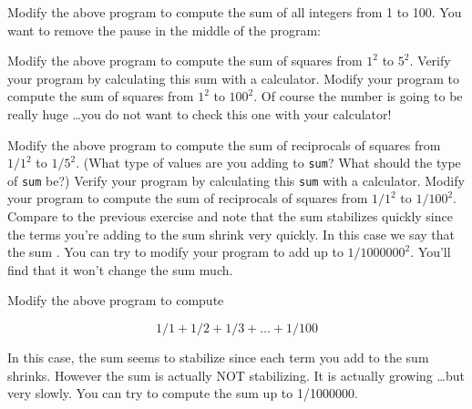 \begin{ex}
 Modify the above program to compute the sum of all
integers from 1 to 100. You want to remove the pause in the middle of
the program:
    
\end{ex}

\begin{ex}
Modify the above program to compute the sum of squares from $1^{2}$ to $5^{2}$. Verify your program by calculating this sum with a calculator. Modify your program to compute the sum of squares from $1^{2}$ to $100^{2}$. Of course the number is going to be really huge \ldots you do not want to check this one with your calculator!
\end{ex}

\begin{ex}
Modify the above program to compute the sum of reciprocals of squares from $1/1^{2}$ to $1/5^{2}$. (What type of values are you adding to \texttt{sum}? What should the type of \texttt{sum} be?) Verify your program by calculating this \texttt{sum} with a calculator. Modify your program to compute the sum of reciprocals of squares from $1/1^{2}$ to $1/100^{2}$. Compare to the previous exercise and note that the sum stabilizes quickly since the terms you're adding to the sum shrink very quickly. In this case we say that the sum . You can try to modify your program to add up to $1/1000000^{2}$. You'll find that it won't change the sum much.
\end{ex}

\begin{ex}
Modify the above program to compute

\[1/1 + 1/2 + 1/3 + \ldots + 1/100\]

In this case, the sum seems to stabilize since each term you add to the
sum shrinks. However the sum is actually NOT stabilizing. It is actually
growing \ldots but very slowly. You can try to compute the sum up to
1/1000000.
\end{ex}

